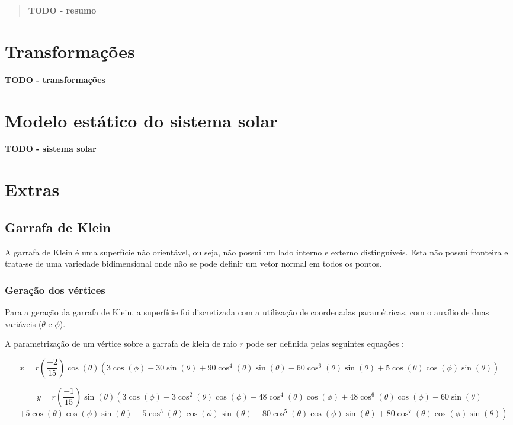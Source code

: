 \documentclass[12pt, a4paper]{article}
\begin{document}
\pagebreak

\begin{abstract}
    \textbf{\color{red} TODO - resumo}
\end{abstract}

\section{Transformações}

\textbf{\color{red} TODO - transformações}

\section{Modelo estático do sistema solar}

\textbf{\color{red} TODO - sistema solar}

\section{Extras}

\subsection{Garrafa de Klein}

A garrafa de Klein é uma superfície não orientável, ou seja, não possui um lado interno e externo
distinguíveis. Esta não possui fronteira e trata-se de uma variedade bidimensional onde não se pode
definir um vetor normal em todos os pontos.

\subsubsection{Geração dos vértices}

Para a geração da garrafa de Klein, a superfície foi discretizada com a utilização de coordenadas
paramétricas, com o auxílio de duas variáveis ($\theta$ e $\phi$).

A parametrização de um vértice sobre a garrafa de klein de raio $r$ pode ser definida pelas
seguintes equações \cite{bottleKlein}:

$$
x = r \left( \frac{-2}{15} \right) \cos(\theta) \left(3 \cos(\phi) - 30 \sin(\theta) +
90 \cos^4(\theta) \sin(\theta) - 60 \cos^6(\theta) \sin(\theta) +
5 \cos(\theta) \cos(\phi) \sin(\theta) \right)
$$

$$
y = r \left( \frac{-1}{15} \right) \sin(\theta) \left( 3 \cos(\phi) - 3 \cos^2(\theta) \cos(\phi)
- 48 \cos^4(\theta) \cos(\phi) + 48 \cos^6(\theta) \cos(\phi) - 60 \sin(\theta) \right.
$$
$$
\quad \left. + 5 \cos(\theta) \cos(\phi) \sin(\theta) - 5 \cos^3(\theta) \cos(\phi) \sin(\theta)
- 80 \cos^5(\theta) \cos(\phi) \sin(\theta) + 80 \cos^7(\theta) \cos(\phi) \sin(\theta) \right)
$$
\end{document}
